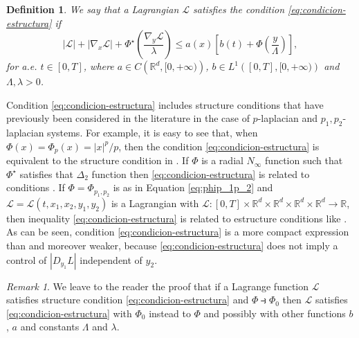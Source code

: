 \documentclass[twoside]{article}
\newtheorem{defi}[thm]{Definition}
\theoremstyle{remark}
\newtheorem{comentario}{Remark}
\newcounter{example}[section]
\newcommand{\rr}{\mathbb{R}}
\renewcommand{\leq}{\leqslant}
\begin{document}
\begin{defi}\label{def:estructura} We say that a Lagrangian $\mathcal{L}$ satisfies the condition \eqref{eq:condicion-estructura} if
\begin{equation}\label{eq:condicion-estructura}
  |\mathcal{L}|+ |\nabla_{x}\mathcal{L}|+\Phi^{\star}\left(\frac{\nabla_{y}\mathcal{L}}{\lambda}\right)
\leq
a(x)\left[b(t)+ \Phi\left(\frac{y}{\Lambda}\right)\right], \tag{$S$}
\end{equation}
for a.e. $t\in [0,T]$,
where  $a\in C\left(\mathbb{R}^d,[0,+\infty)\right)$, $b\in L^1\left([0,T],[0,+\infty)\right) $ and $\Lambda,\lambda>0$.
\end{defi}

Condition \eqref{eq:condicion-estructura} includes structure conditions that have previously been considered in the literature in the case of $p$-laplacian and $p_1,p_2$-laplacian systems. For example, it is easy to see that, when $\Phi(x)=\Phi_p(x)=|x|^p/p$, then  the condition \eqref{eq:condicion-estructura}  is equivalent to the structure condition in  \cite[Thm. 1.4]{mawhin2010critical}.  If $\Phi$ is a radial $N_{\infty}$ function such that $\Phi^{\star}$ satisfies that $\Delta_2$ function  then \eqref{eq:condicion-estructura} is related to conditions  \cite[Eq. (2)-(4)]{ABGMS2015}.   If $\Phi=\Phi_{p_1,p_2}$ is as in Equation \eqref{eq:phip_1p_2} and $\mathcal{L}=\mathcal{L}(t,x_1,x_2,y_1,y_2)$ is a Lagrangian with $\mathcal{L}:[0,T]\times\rr^d\times\rr^d\times\rr^d\times\rr^d\to\rr$, then inequality \eqref{eq:condicion-estructura} is related to estructure conditions like
\cite[Lemma 3.1, Eq. (3.1)]{Tian2007192}. As can be seen, condition \eqref{eq:condicion-estructura} is a more compact expression than \cite[Lemma 3.1, Eq. (3.1)]{Tian2007192} and moreover   weaker, because  \eqref{eq:condicion-estructura} does not imply a control of
$|D_{y_1}L|$ independent of $y_2$. 



\begin{comentario} We leave to the reader the proof that if a Lagrange function $\mathcal{L}$ satisfies structure condition \eqref{eq:condicion-estructura} and $\Phi\strictif \Phi_0$ then $\mathcal{L}$ satisfies \eqref{eq:condicion-estructura} with $\Phi_0$ instead to $\Phi$ and possibly with other functions $b$, $a$ and constants $\Lambda$ and $\lambda$.
 \end{comentario}
\end{document}
